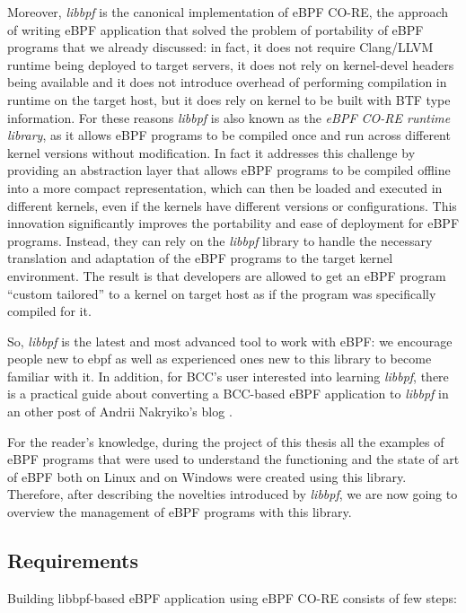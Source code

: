 Moreover, \textit{libbpf} is the canonical implementation of eBPF CO-RE, the approach of writing eBPF application that solved the problem of portability of eBPF programs that we already discussed: in fact, it does not require Clang/LLVM runtime being deployed to target servers, it does not rely on kernel-devel headers being available and it does not introduce overhead of performing compilation in runtime on the target host, but it does rely on kernel to be built with BTF type information.
For these reasons \textit{libbpf} is also known as the \textit{eBPF CO-RE runtime library}, as it allows eBPF programs to be compiled once and run across different kernel versions without modification.
In fact it addresses this challenge by providing an abstraction layer that allows eBPF programs to be compiled offline into a more compact representation, which can then be loaded and executed in different kernels, even if the kernels have different versions or configurations.
This innovation significantly improves the portability and ease of deployment for eBPF programs.
Instead, they can rely on the \textit{libbpf} library to handle the necessary translation and adaptation of the eBPF programs to the target kernel environment.
The result is that developers are allowed to get an eBPF program ``custom tailored'' to a kernel on target host as if the program was specifically compiled for it.

So, \textit{libbpf} is the latest and most advanced tool to work with eBPF: we encourage people new to ebpf as well as experienced ones new to this library to become familiar with it.
In addition, for BCC's user interested into learning \textit{libbpf}, there is a practical guide about converting a BCC-based eBPF application to \textit{libbpf} in an other post of Andrii Nakryiko's blog \cite{BCCTolibbpfGuide}.

For the reader's knowledge, during the project of this thesis all the examples of eBPF programs that were used to understand the functioning and the state of art of eBPF both on Linux and on Windows were created using this library.
Therefore, after describing the novelties introduced by \textit{libbpf}, we are now going to overview the management of eBPF programs with this library.

\subsection{Requirements}

Building libbpf-based eBPF application using eBPF CO-RE consists of few steps:

